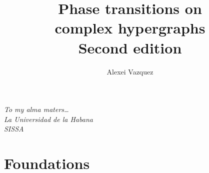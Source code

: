 \documentclass[10pt]{book}
\begin{document}
\frontmatter

\title{Phase transitions on\\ complex hypergraphs\\[1.2ex]{\large Second edition}}

\author{Alexei Vazquez}
\date{}
\maketitle

\thispagestyle{empty}
\vspace*{\fill}
\begin{center}
{\itshape To my alma maters\dots\\[2pt]
La Universidad de la Habana\\[2pt]
SISSA}
\end{center}
\vspace*{\fill}
\clearpage



\setcounter{tocdepth}{0}
\tableofcontents



\mainmatter

\part{Foundations}



\end{document}
